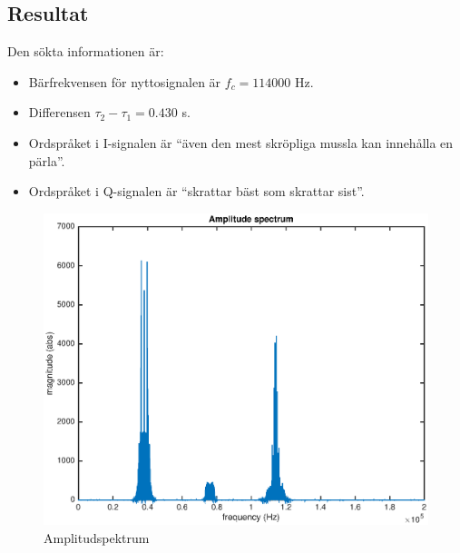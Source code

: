 \documentclass[10pt]{article}
\begin{document}
\begin{multicols}{2}
\section{Resultat}

Den sökta informationen är:

\begin{itemize}
\item Bärfrekvensen för nyttosignalen är $f_c = 114000$ Hz.
\item Differensen $\tau_{2} - \tau_{1} = 0.430$ s.
\item Ordspråket i I-signalen är ``även den mest skröpliga mussla kan innehålla en pärla''.
\item Ordspråket i Q-signalen är ``skrattar bäst som skrattar sist''.
\end{itemize}
\end{multicols}

\clearpage

\begin{figure}
  \centering
  \includegraphics[scale=0.55]{figurer/amplitudspektrum.eps}
  \caption{Amplitudspektrum}
  \label{amplitudspektrum}
\end{figure}
\end{document}
